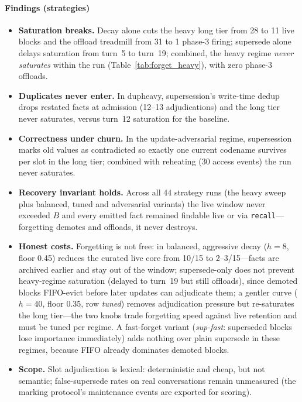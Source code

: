 \documentclass[10pt]{article}
\begin{document}
\paragraph{Findings (strategies)}
\begin{itemize}
\item \textbf{Saturation breaks.} Decay alone cuts the heavy long tier from 28 to 11 live blocks and the offload treadmill from 31 to 1 phase-3 firing; supersede alone delays saturation from turn~5 to turn~19; combined, the heavy regime \emph{never saturates} within the run (Table~\ref{tab:forget_heavy}), with zero phase-3 offloads.
\item \textbf{Duplicates never enter.} In dupheavy, supersession's write-time dedup drops restated facts at admission (12--13 adjudications) and the long tier never saturates, versus turn~12 saturation for the baseline.
\item \textbf{Correctness under churn.} In the update-adversarial regime, supersession marks old values as contradicted so exactly one current codename survives per slot in the long tier; combined with reheating (30 access events) the run never saturates.
\item \textbf{Recovery invariant holds.} Across all 44 strategy runs (the heavy sweep plus balanced, tuned and adversarial variants) the live window never exceeded $B$ and every emitted fact remained findable live or via \texttt{recall}---forgetting demotes and offloads, it never destroys.
\item \textbf{Honest costs.} Forgetting is not free: in balanced, aggressive decay ($h=8$, floor 0.45) reduces the curated live core from 10/15 to 2--3/15---facts are archived earlier and stay out of the window; supersede-only does not prevent heavy-regime saturation (delayed to turn~19 but still offloads), since demoted blocks FIFO-evict before later updates can adjudicate them; a gentler curve ($h=40$, floor 0.35, row \emph{tuned}) removes adjudication pressure but re-saturates the long tier---the two knobs trade forgetting speed against live retention and must be tuned per regime. A fast-forget variant (\emph{sup-fast}: superseded blocks lose importance immediately) adds nothing over plain supersede in these regimes, because FIFO already dominates demoted blocks.
\item \textbf{Scope.} Slot adjudication is lexical: deterministic and cheap, but not semantic; false-supersede rates on real conversations remain unmeasured (the marking protocol's maintenance events are exported for scoring).
\end{itemize}
\end{document}
